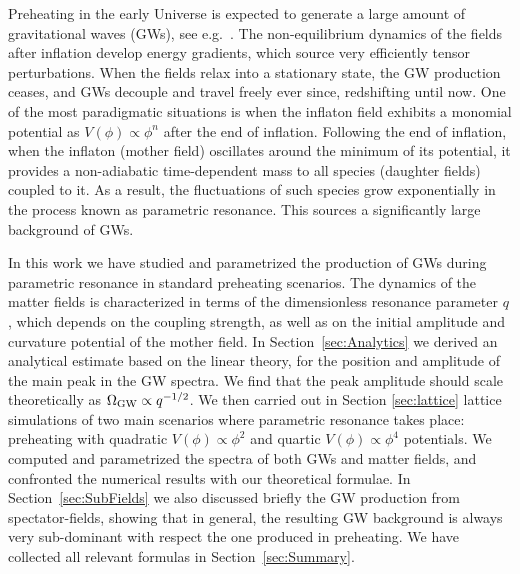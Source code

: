 \documentclass[a4paper,11pt]{article}
\begin{document}
Preheating in the early Universe is expected to generate a large amount of gravitational waves (GWs), see e.g.~\cite{Khlebnikov:1997di,Easther:2006gt,Easther:2006vd,GarciaBellido:2007af,Dufaux:2007pt,Dufaux:2008dn,Figueroa:2011ye,Bethke:2013aba,Bethke:2013vca}. The non-equilibrium dynamics of the fields after inflation develop energy gradients, which source very efficiently tensor perturbations. When the fields relax into a stationary state, the GW production ceases, and GWs decouple and travel freely ever since, redshifting until now. One of the most paradigmatic situations is when the inflaton field exhibits a monomial potential as $V(\phi) \propto \phi^{n}$ after the end of inflation. Following the end of inflation, when the inflaton (mother field) oscillates around the minimum of its potential, it provides a non-adiabatic time-dependent mass to all species (daughter fields) coupled to it. As a result, the fluctuations of such species grow exponentially in the process known as parametric resonance. This sources a significantly large background of GWs.

In this work we have studied and parametrized the production of GWs during parametric resonance in standard preheating scenarios. The dynamics of the matter fields is characterized in terms of the dimensionless resonance parameter $q$, which depends on the coupling strength, as well as on the initial amplitude and curvature potential of the mother field. In Section~\ref{sec:Analytics} we derived an analytical estimate based on the linear theory, for the position and amplitude of the main peak in the GW spectra. We find that the peak amplitude should scale theoretically as $\Omega_{\rm GW} \propto q^{-1/2}$. We then carried out in Section \ref{sec:lattice} lattice simulations of two main scenarios where parametric resonance takes place: preheating with quadratic $V(\phi) \propto \phi^2$ and quartic $V(\phi) \propto \phi^4$ potentials. We computed and parametrized the spectra of both GWs and matter fields, and confronted the numerical results with our theoretical formulae. In Section~\ref{sec:SubFields} we also discussed briefly the GW production from spectator-fields, showing that in general, the resulting GW background is always very sub-dominant with respect the one produced in preheating. We have collected all relevant formulas in Section~\ref{sec:Summary}.
\end{document}
